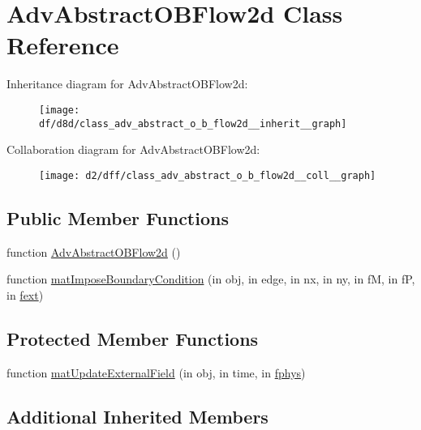 \hypertarget{class_adv_abstract_o_b_flow2d}{}\section{Adv\+Abstract\+O\+B\+Flow2d Class Reference}
\label{class_adv_abstract_o_b_flow2d}


Inheritance diagram for Adv\+Abstract\+O\+B\+Flow2d\+:
\nopagebreak
\begin{figure}[H]
\begin{center}
\leavevmode
\texttt{[image: df/d8d/class\_adv\_abstract\_o\_b\_flow2d\_\_inherit\_\_graph]}
\end{center}
\end{figure}


Collaboration diagram for Adv\+Abstract\+O\+B\+Flow2d\+:
\nopagebreak
\begin{figure}[H]
\begin{center}
\leavevmode
\texttt{[image: d2/dff/class\_adv\_abstract\_o\_b\_flow2d\_\_coll\_\_graph]}
\end{center}
\end{figure}
\subsection*{Public Member Functions}
\begin{DoxyCompactItemize}
\item 
function \hyperlink{class_adv_abstract_o_b_flow2d_aca704f3c8e8436ec1cd246704e82be54}{Adv\+Abstract\+O\+B\+Flow2d} ()
\item 
function \hyperlink{class_adv_abstract_o_b_flow2d_a4c0f63fbfbbd0ee2c7634f4bb407c004}{mat\+Impose\+Boundary\+Condition} (in obj, in edge, in nx, in ny, in fM, in fP, in \hyperlink{class_ndg_phys_mat_a2b0e8a77bf5f6fe870b12e400d6d83f3}{fext})
\end{DoxyCompactItemize}
\subsection*{Protected Member Functions}
\begin{DoxyCompactItemize}
\item 
function \hyperlink{class_adv_abstract_o_b_flow2d_ab72adc642ed98799cc1c902aae4502e8}{mat\+Update\+External\+Field} (in obj, in time, in \hyperlink{class_ndg_phys_a6b25724fc9474d32018439009072f0a9}{fphys})
\end{DoxyCompactItemize}
\subsection*{Additional Inherited Members}


